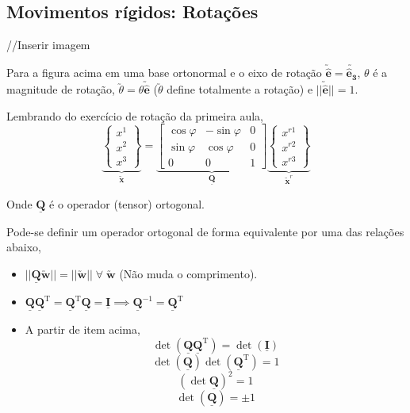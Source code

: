 	\subsection{Movimentos rígidos: Rotações}
	
	//Inserir imagem
	
	Para a figura acima em uma base ortonormal e o eixo de rotação $\utilde{\mathbf{\hat{e}}}=\utilde{\mathbf{\hat{e}_3}}$, $\theta$ é a magnitude de rotação, $\utilde{\theta}=\theta\utilde{\mathbf{\hat{e}}}$ ($\utilde{\theta}$ define totalmente a rotação) e $||\utilde{\mathbf{\hat{e}}}||=1$.
	
	Lembrando do exercício de rotação da primeira aula,
	\[
		\underbrace{\begin{Bmatrix}
			x^1 \\ x^2 \\ x^3
		\end{Bmatrix}}_{\displaystyle\utilde{\mathbf{x}}}
		=
		\underbrace{
		\begin{bmatrix}
			\cos\varphi & -\sin\varphi & 0 \\
			\sin\varphi & \cos\varphi & 0 \\
			0 & 0 & 1
		\end{bmatrix}}_{\displaystyle\underline{\mathbf{Q}}}
		\underbrace{
		\begin{Bmatrix}
			x^{r1} \\ x^{r2} \\ x^{r3}
		\end{Bmatrix}}_{\displaystyle\utilde{\mathbf{x}}^r}		
	\]
	
	Onde $\underline{\mathbf{Q}}$ é o operador (tensor) ortogonal.
	
	Pode-se definir um operador ortogonal de forma equivalente por uma das relações abaixo,
	\begin{itemize}
		\item $||\underline{\mathbf{Q}}\utilde{\mathbf{w}}||=||\utilde{\mathbf{w}}||\;\forall\;\utilde{\mathbf{w}}$ (Não muda o comprimento).
		\item $\underline{\mathbf{Q}}\underline{\mathbf{Q}}^{\text{T}}=\underline{\mathbf{Q}}^{\text{T}}\underline{\mathbf{Q}}=\underline{\mathbf{I}}\implies\underline{\mathbf{Q}}^{-1}=\underline{\mathbf{Q}}^{\text{T}}$
		\item A partir de item acima,
		\[\det(\underline{\mathbf{Q}}\underline{\mathbf{Q}}^{\text{T}})=\det(\underline{\mathbf{I}})\]
		\[\det(\underline{\mathbf{Q}})\det(\underline{\mathbf{Q}}^{\text{T}})=1\]
		\[(\det\underline{\mathbf{Q}})^2=1\]
		\[\det(\underline{\mathbf{Q}})=\pm1\]
	\end{itemize}
	
